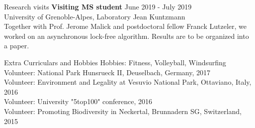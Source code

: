 \documentclass{resume} %
\begin{document}
\begin{rSection}{Research visits}
{\bf Visiting MS student } \hfill June 2019 - July 2019 \\
University of Grenoble-Alpes, Laboratory Jean Kuntzmann\\
Together with Prof. Jerome Malick and postdoctoral fellow Franck Lutzeler, we worked on an asynchronous lock-free algorithm. Results are to be organized into a paper.
\end{rSection}


\begin{rSection}{Extra Curriculars and Hobbies}
{Hobbies: Fitness, Volleyball, Windsurfing}\\
{Volunteer: National Park Hunsrueck II, Deuselbach, Germany, 2017}\\
{Volunteer: Environment and Legality at Vesuvio National Park, Ottaviano, Italy, 2016}\\
{Volunteer: University "5top100" conference, 2016}\\
{Volunteer: Promoting Biodiversity in Neckertal, Brunnadern SG, Switzerland, 2015}
\end{rSection}


\end{document}
